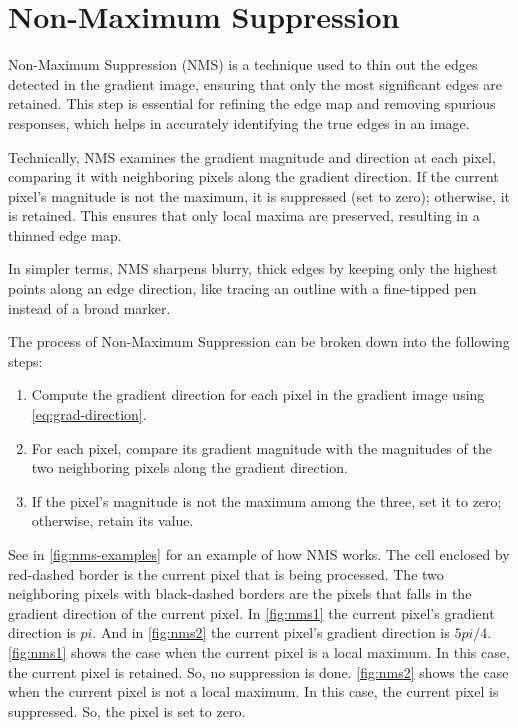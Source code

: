 \section{Non-Maximum Suppression}

Non-Maximum Suppression (NMS) is a technique used to thin out the edges detected in the gradient image, ensuring that only the most significant edges are retained. This step is essential for refining the edge map and removing spurious responses, which helps in accurately identifying the true edges in an image.

Technically, NMS examines the gradient magnitude and direction at each pixel, comparing it with neighboring pixels along the gradient direction. If the current pixel's magnitude is not the maximum, it is suppressed (set to zero); otherwise, it is retained. This ensures that only local maxima are preserved, resulting in a thinned edge map.

In simpler terms, NMS sharpens blurry, thick edges by keeping only the highest points along an edge direction, like tracing an outline with a fine-tipped pen instead of a broad marker.

The process of Non-Maximum Suppression can be broken down into the following steps:

\begin{enumerate}
    \item Compute the gradient direction for each pixel in the gradient image using \autoref{eq:grad-direction}.
    \item For each pixel, compare its gradient magnitude with the magnitudes of the two neighboring pixels along the gradient direction.
    \item If the pixel's magnitude is not the maximum among the three, set it to zero; otherwise, retain its value.
\end{enumerate}


See in \autoref{fig:nms-examples} for an example of how NMS works. The cell enclosed by red-dashed border is the current pixel that is being processed. The two neighboring pixels with black-dashed borders are the pixels that falls in the gradient direction of the current pixel. In \autoref{fig:nms1} the current pixel's gradient direction is $pi$. And in \autoref{fig:nms2} the current pixel's gradient direction is $5pi/4$.
\autoref{fig:nms1} shows the case when the current pixel is a local maximum. In this case, the current pixel is retained. So, no suppression is done. \autoref{fig:nms2} shows the case when the current pixel is not a local maximum. In this case, the current pixel is suppressed. So, the pixel is set to zero.

